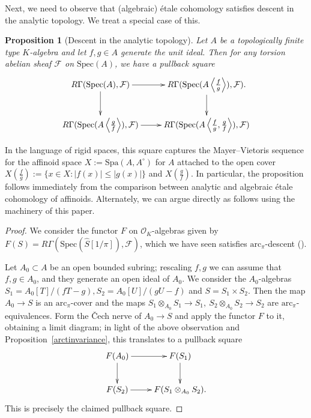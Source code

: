 \documentclass[reqno]{amsart}
\newcommand{\sF}{\mathcal{F}}
\newcommand{\spec}{\mathrm{Spec}}
\newcommand{\arc}{\mathrm{arc}}
\newtheorem{proposition}[theorem]{Proposition}
\theoremstyle{definition}
\begin{document}
\newcommand{\spm}{\mathrm{Spm}}

Next, we need to observe that (algebraic) \'etale cohomology satisfies descent in the
analytic topology. 
We treat a special case of this. 

\begin{proposition}[Descent in the analytic topology] 
\label{analyticdescent}
Let $A$ be a topologically finite type $K$-algebra and let $f, g \in A$ generate the unit ideal. 
Then for any torsion abelian sheaf $\sF$ on $\spec(A)$, we have a pullback square
\[ \xymatrix{
R \Gamma( \spec(A), \sF) \ar[d] \ar[r] & 
R \Gamma( \spec(A\left \langle \frac{f}{g}\right\rangle), \sF) . \ar[d]  \\
R \Gamma( \spec(A\left \langle \frac{g}{f}\right\rangle), \sF) \ar[r] & 
 R \Gamma( \spec(A\left \langle \frac{f}{g}, \frac{g}{f}\right\rangle), \sF)
}\]
\end{proposition} 

In the language of rigid spaces, this square captures the Mayer--Vietoris sequence for the affinoid space $X := \mathrm{Spa}(A,A^\circ)$ for $A$ attached to the open cover $X(\frac{f}{g}) := \{x \in X : |f(x)| \leq |g(x)|\}$ and $X(\frac{g}{f})$. In particular, the proposition follows immediately from the comparison between analytic and algebraic \'etale cohomology of affinoids. Alternately, we can argue directly as follows using the machinery of this paper.


\begin{proof} 
We consider the functor $F$ on $\mathcal{O}_K$-algebras given by $F(S) = R
\Gamma( \spec(\widehat{S}[1/\pi]), \sF)$, which we have seen satisfies
$\arc_\pi$-descent (). 

Let $A_0 \subset A$ be an open bounded subring; rescaling $f,g$ we can assume
that $f, g \in A_0$, and they generate an open ideal of $A_0$. 
We consider the $A_0$-algebras $S_1 =  A_0[T]/(fT - g) , S_2 = A_0[U]/(gU -
f)$ and $S= S_1 \times S_2$. Then the map $A_0 \to S$ is an $\arc_\pi$-cover and
the maps $S_1
\otimes_{A_0} S_1 \to S_1, \  S_2 \otimes_{A_0} S_2 \to S_2$ are $\arc_\pi$-equivalences. 
Form the \v{C}ech nerve of $A_0 \to S$ and apply the functor $F$ to it,
obtaining a limit diagram; in
light of the above observation and Proposition~\ref{arctinvariance}, this
translates to a pullback square
\[ \xymatrix{
F(A_0) \ar[d]  \ar[r] &  F(S_1) \ar[d]  \\
F(S_2) \ar[r] &  F(S_1 \otimes_{A_0} S_2). 
}\]
This is precisely the claimed pullback square. 
\end{proof} 
\end{document}
